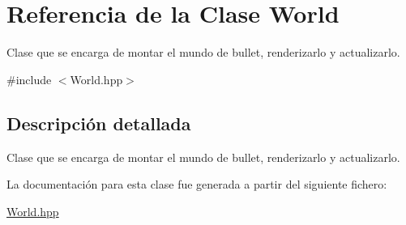 \hypertarget{class_world}{}\section{Referencia de la Clase World}
\label{class_world}


Clase que se encarga de montar el mundo de bullet, renderizarlo y actualizarlo.  




{\ttfamily \#include $<$World.\+hpp$>$}



\subsection{Descripción detallada}
Clase que se encarga de montar el mundo de bullet, renderizarlo y actualizarlo. 

La documentación para esta clase fue generada a partir del siguiente fichero\+:\begin{DoxyCompactItemize}
\item 
\mbox{\hyperlink{_world_8hpp}{World.\+hpp}}\end{DoxyCompactItemize}
